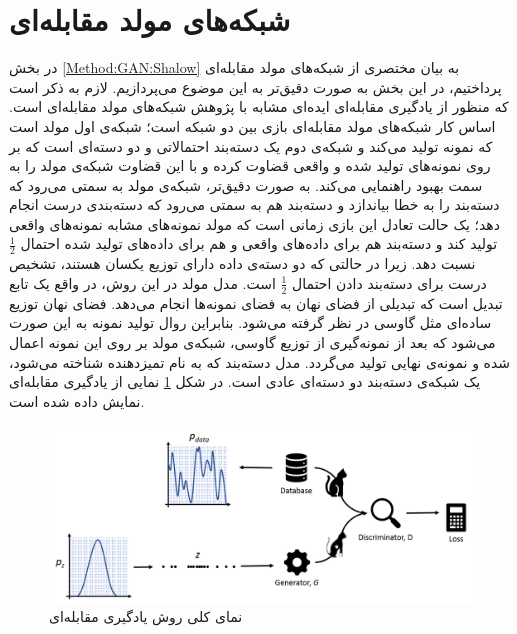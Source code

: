  \section{شبکه‌های مولد مقابله‌ای}
  \label{Method:GAN:Deep}
 در بخش
 \ref{Method:GAN:Shalow}
 به بیان مختصری از شبکه‌های مولد مقابله‌ای پرداختیم، در این بخش به صورت دقیق‌تر به این موضوع می‌پردازیم.
لازم به ذکر است که منظور از یادگیری مقابله‌ای اید‌ه‌ای مشابه با پژوهش شبکه‌های مولد مقابله‌ای
 \cite{Goodfellow2014}
 است.
 \newline
اساس کار شبکه‌های مولد مقابله‌ای
 \cite{Goodfellow2014}
 بازی بین دو شبکه است؛ شبکه‌ی اول مولد است که نمونه‌‌ تولید می‌کند و شبکه‌ی دوم یک دسته‌بند  احتمالاتی  و دو دسته‌ای است که بر روی نمونه‌های تولید شده و واقعی قضاوت کرده و با این قضاوت شبکه‌ی مولد را به سمت بهبود راهنمایی می‌کند. به صورت دقیق‌تر، شبکه‌ی مولد به سمتی می‌رود که دسته‌بند را به خطا بیاندازد و دسته‌بند هم به سمتی می‌رود که دسته‌بندی درست انجام دهد؛ یک حالت تعادل این بازی زمانی است که مولد نمونه‌های مشابه نمونه‌های واقعی تولید کند و دسته‌بند هم برای داده‌های واقعی و هم برای داده‌های تولید شده احتمال $\frac{1}{2}$ نسبت دهد. زیرا در حالتی که دو دسته‌ی داده دارای توزیع یکسان هستند، تشخیص درست برای دسته‌بند دادن احتمال $\frac{1}{2}$ است.
 \newline
  مدل مولد در این روش، در واقع یک تابع تبدیل است که تبدیلی از فضای نهان به فضای نمونه‌ها انجام می‌دهد. فضای نهان توزیع ساده‌ای مثل گاوسی در نظر گرفته می‌شود. بنابراین روال تولید نمونه به این صورت می‌شود که بعد از نمونه‌گیری از توزیع گاوسی، شبکه‌ی مولد بر روی این نمونه اعمال شده و نمونه‌ی نهایی تولید می‌گردد.
  مدل دسته‌بند که به نام تمیزدهنده  شناخته می‌شود، یک شبکه‌ی دسته‌بند دو دسته‌ای عادی است.
  در شکل
  \ref{Figure:GAN:Architecture}
  نمایی از یادگیری مقابله‌ای نمایش داده شده است.
  \begin{figure}[!htb]
  	\centering
  	\includegraphics[width=1\textwidth]{images/ArchitectureGAN.png} 
  	\caption{نمای کلی روش یادگیری مقابله‌ای}
  	\label{Figure:GAN:Architecture}
  \end{figure}
